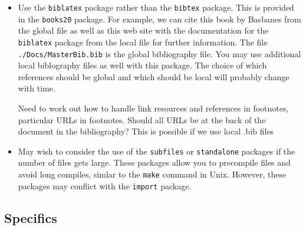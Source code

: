 \documentclass{article}
\begin{document}
\begin{itemize}
\item Use the \texttt{biblatex} package rather than the
  \texttt{bibtex} package. This is provided in the \texttt{books20}
  package.  For example, we can cite this book by Basbanes
  \cite{basbanes:2003} from the global file as well as this web site
  with the documentation for the \texttt{biblatex} package \cite{Lehman2018}
  from the local file for further information. The file
  \texttt{./Docs/MasterBib.bib} is the global bibliography file. You
  may use additional local biblography files as well with this
  package.  The choice of which references should be global and which
  should be local will probably change with time.

  Need to work out how to handle link resources and references in
  footnotes, particular URLs in footnotes. Should all URLs be at the back
  of the document in the bibliography?  This is possible if we use local
  .bib files
  
\item May wish to consider the use of the \texttt{subfiles} or
  \texttt{standalone} packages if the number of files gets
  large. These packages allow you to precompile files and avoid long
  compiles, simlar to the \texttt{make} command in Unix.  However,
  these packages may conflict with the \texttt{import} package.


\end{itemize}

\subsection{Specifics}
\end{document}
